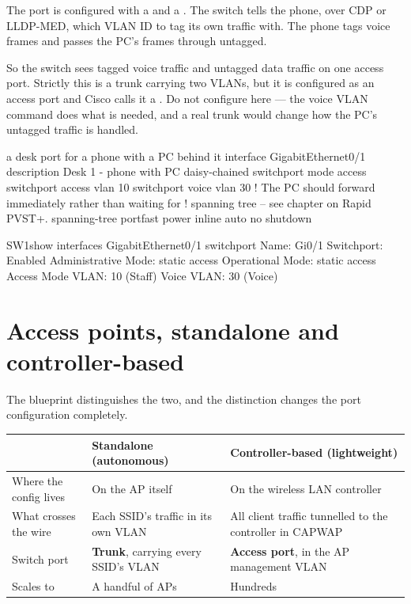 \begin{conceptbox}
The port is configured with a  and a . The
switch tells the phone, over CDP or LLDP-MED, which VLAN ID to tag its own
traffic with. The phone tags voice frames and passes the PC's frames through
untagged.

So the switch sees tagged voice traffic and untagged data traffic on one access
port. Strictly this is a trunk carrying two VLANs, but it is configured as an
access port and Cisco calls it a . Do not configure
 here --- the voice VLAN command does what is needed,
and a real trunk would change how the PC's untagged traffic is handled.
\end{conceptbox}

\begin{config}{a desk port for a phone with a PC behind it}
interface GigabitEthernet0/1
 description Desk 1 - phone with PC daisy-chained
 switchport mode access
 switchport access vlan 10
 switchport voice vlan 30
 ! The PC should forward immediately rather than waiting for
 ! spanning tree -- see chapter on Rapid PVST+.
 spanning-tree portfast
 power inline auto
 no shutdown
\end{config}

\begin{verify}{SW1}{show interfaces GigabitEthernet0/1 switchport}
Name: Gi0/1
Switchport: Enabled
Administrative Mode: static access
Operational Mode: static access
Access Mode VLAN: 10 (Staff)
Voice VLAN: 30 (Voice)
\end{verify}

\section{Access points, standalone and controller-based}

The blueprint distinguishes the two, and the distinction changes the port
configuration completely.

\begin{longtable}{@{}L{3.8cm}L{5.4cm}L{6.0cm}@{}}
\toprule
{}
\textbf{} & \textbf{Standalone (autonomous)} & \textbf{Controller-based (lightweight)} \\
\midrule
\endhead
Where the config lives & On the AP itself & On the wireless LAN controller \\
What crosses the wire & Each SSID's traffic in its own VLAN & All client traffic
tunnelled to the controller in CAPWAP \\
Switch port & \textbf{Trunk}, carrying every SSID's VLAN & \textbf{Access port},
in the AP management VLAN \\
Scales to & A handful of APs & Hundreds \\
\bottomrule
\end{longtable}

